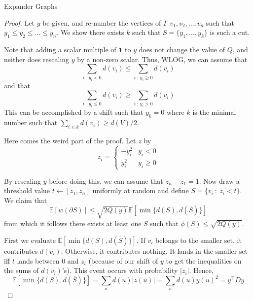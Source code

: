 \documentclass{article}
\newcommand{\E}{\mathbb E}
\newcommand{\from}{\leftarrow}
\begin{document}
\begin{section}{Expander Graphs}
\begin{proof}
     Let $y$ be given, and re-number the vertices of $\Gamma$ $v_1, v_2, \ldots, v_n$ such that $y_1 \leq y_2 \leq \ldots \leq y_n$.
     We show there exists $k$ such that $S = \{y_1, \ldots, y_k\}$ is such a cut.

     Note that adding a scalar multiple of $\mathbf 1$ to $y$ does not change the value of $Q$, and neither does rescaling $y$ by a non-zero scalar.
     Thus, WLOG, we can assume that
     $$
     \sum_{i~:~y_i < 0}d(v_i) \leq \sum_{i~:~y_i \geq 0}d(v_i)
     $$
     and that 
     $$
     \sum_{i~:~y_i \leq 0}d(v_i) \geq \sum_{i~:~y_i > 0}d(v_i)
     $$
     This can be accomplished by a shift such that $y_k = 0$ where $k$ is the minimal number such that $\sum_{i \leq k} d(v_i) \geq d(V)/2$.

     Here comes the weird part of the proof.
     Let $z$ by
     $$
     z_i = \begin{cases} -y_i^2 & y_i < 0\\ y_i^2 & y_i \geq 0 \end{cases}
     $$

     By rescaling $y$ before doing this, we can assume that $z_n - z_1 = 1$.
     Now draw a threshold value $t \from [z_1,z_n]$ uniformly at random and define $S = \{v_i~:~z_i < t\}$.
     We claim that
     $$
     \E[w(\partial S)] \leq \sqrt{2Q(y)} \E[\min\{d(S),d(\overline S)\}]
     $$
     from which it follows there exists at least one $S$ such that $\phi(S) \leq \sqrt{2Q(y)}$.

     First we evaluate $\E[\min\{d(S),d(\overline S)\}]$.
     If $v_i$ belongs to the smaller set, it contributes $d(v_i)$.
     Otherwise, it contributes nothing.
     It lands in the smaller set iff $t$ lands between $0$ and $z_i$ (because of our shift of $y$ to get the inequalities on the sums of $d(v_i)$'s).
     This event occurs with probability $|z_i|$.
     Hence,
     $$
     \E[\min\{d(S),d(\overline S)\}] = \sum_ud(u)|z(u)| = \sum_ud(u)y(u)^2 = y^\intercal D y
     $$


\end{proof}
\end{section}
\end{document}
